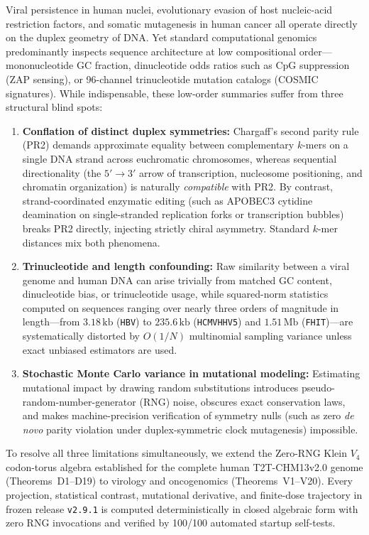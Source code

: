 \documentclass[11pt, a4paper]{article}
\DeclareRobustCommand{\_}{\textunderscore\allowbreak}
\begin{document}
Viral persistence in human nuclei, evolutionary evasion of host nucleic-acid restriction factors, and somatic mutagenesis in human cancer all operate directly on the duplex geometry of DNA. Yet standard computational genomics predominantly inspects sequence architecture at low compositional order---mononucleotide GC fraction, dinucleotide odds ratios such as CpG suppression (ZAP sensing), or 96-channel trinucleotide mutation catalogs (COSMIC signatures). While indispensable, these low-order summaries suffer from three structural blind spots:
\begin{enumerate}
    \item \textbf{Conflation of distinct duplex symmetries:} Chargaff's second parity rule (PR2) demands approximate equality between complementary $k$-mers on a single DNA strand across euchromatic chromosomes, whereas sequential directionality (the $5' \to 3'$ arrow of transcription, nucleosome positioning, and chromatin organization) is naturally \emph{compatible} with PR2. By contrast, strand-coordinated enzymatic editing (such as APOBEC3 cytidine deamination on single-stranded replication forks or transcription bubbles) breaks PR2 directly, injecting strictly chiral asymmetry. Standard $k$-mer distances mix both phenomena.
    \item \textbf{Trinucleotide and length confounding:} Raw similarity between a viral genome and human DNA can arise trivially from matched GC content, dinucleotide bias, or trinucleotide usage, while squared-norm statistics computed on sequences ranging over nearly three orders of magnitude in length---from $3.18\,\mathrm{kb}$ (\texttt{HBV}) to $235.6\,\mathrm{kb}$ (\texttt{HCMV\_HHV5}) and $1.51\,\mathrm{Mb}$ (\texttt{FHIT})---are systematically distorted by $O(1/N)$ multinomial sampling variance unless exact unbiased estimators are used.
    \item \textbf{Stochastic Monte Carlo variance in mutational modeling:} Estimating mutational impact by drawing random substitutions introduces pseudo-random-number-generator (RNG) noise, obscures exact conservation laws, and makes machine-precision verification of symmetry nulls (such as zero \textit{de novo} parity violation under duplex-symmetric clock mutagenesis) impossible.
\end{enumerate}

To resolve all three limitations simultaneously, we extend the Zero-RNG Klein $V_4$ codon-torus algebra established for the complete human T2T-CHM13v2.0 genome (Theorems~D1--D19) to virology and oncogenomics (Theorems~V1--V20). Every projection, statistical contrast, mutational derivative, and finite-dose trajectory in frozen release \texttt{v2.9.1} is computed deterministically in closed algebraic form with zero RNG invocations and verified by 100/100 automated startup self-tests.
\end{document}
